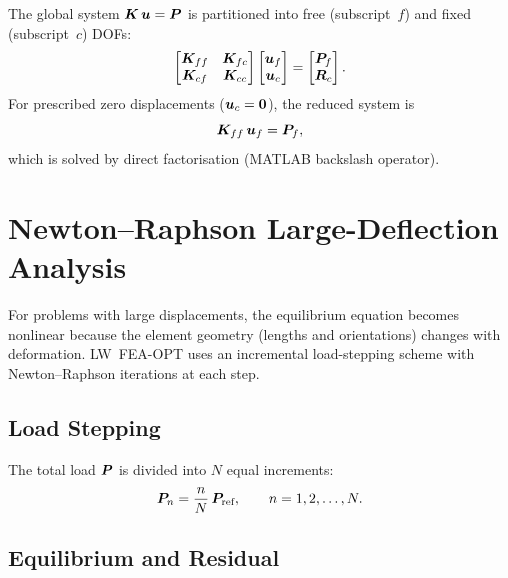 The global system $\bm{K}\,\bm{u} = \bm{P}$ is partitioned into free
(subscript~$f$) and fixed (subscript~$c$) DOFs:
%
\begin{equation}
\begin{bmatrix}
\bm{K}_{ff} & \bm{K}_{fc} \\
\bm{K}_{cf} & \bm{K}_{cc}
\end{bmatrix}
\begin{bmatrix} \bm{u}_f \\ \bm{u}_c \end{bmatrix}
=
\begin{bmatrix} \bm{P}_f \\ \bm{R}_c \end{bmatrix}.
\end{equation}
%
For prescribed zero displacements ($\bm{u}_c = \bm{0}$), the reduced
system is
%
\begin{equation}
    \bm{K}_{ff}\, \bm{u}_f = \bm{P}_f,
\end{equation}
%
which is solved by direct factorisation (MATLAB backslash operator).

\section{Newton--Raphson Large-Deflection Analysis}
\label{sec:newton_raphson}

For problems with large displacements, the equilibrium equation becomes
nonlinear because the element geometry (lengths and orientations) changes
with deformation.  LW~FEA-OPT uses an incremental load-stepping scheme
with Newton--Raphson iterations at each step.

\subsection{Load Stepping}

The total load $\bm{P}$ is divided into $N$ equal increments:
%
\begin{equation}
    \bm{P}_n = \frac{n}{N}\, \bm{P}_{\text{ref}}, \qquad n = 1, 2, \ldots, N.
\end{equation}

\subsection{Equilibrium and Residual}

